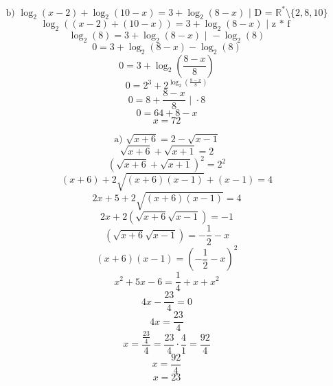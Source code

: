 \documentclass{article}
\begin{document}
\[
\text{b) } \log_2(x-2) + \log_2(10-x) = 3 + \log_2(8-x) \text{ | D = } \mathbb{R}^* \setminus \{2,8,10\}
\]
\[
\log_2((x-2) + (10-x)) = 3 + \log_2(8-x) \text{ | z * f }
\]
\[
\log_2(8) = 3 + \log_2(8-x) \text{ | } -\log_2(8)
\]
\[
0 = 3 + \log_2(8-x) - \log_2(8)
\]
\[
0 = 3 + \log_2\left(\frac{8-x}{8}\right)
\]
\[
0 = 2^3 + 2^{\log_2\left(\frac{8-x}{8}\right)}
\]
\[
0 = 8 + \frac{8-x}{8} \text{ | } \cdot 8
\]
\[
0 = 64 + 8 - x
\]
\[
x = 72
\]

\[
\text{a) } \sqrt{x+6} = 2 - \sqrt{x-1}
\]
\[
\sqrt{x+6} + \sqrt{x+1} = 2
\]
\[
(\sqrt{x+6} + \sqrt{x+1})^2 = 2^2
\]
\[
(x+6) + 2\sqrt{(x+6)(x-1)} + (x-1) = 4
\]
\[
2x + 5 + 2\sqrt{(x+6)(x-1)} = 4
\]
\[
2x + 2(\sqrt{x+6}\sqrt{x-1}) = -1
\]
\[
(\sqrt{x+6}\sqrt{x-1}) = -\frac{1}{2} - x
\]
\[
(x+6)(x-1) = \left(-\frac{1}{2} - x\right)^2
\]
\[
x^2 + 5x - 6 = \frac{1}{4} + x + x^2
\]
\[
4x - \frac{23}{4} = 0
\]
\[
4x = \frac{23}{4}
\]
\[
x = \frac{\frac{23}{4}}{4} = \frac{23}{4} \cdot \frac{4}{1} = \frac{92}{4}
\]
\[
x = \frac{92}{4}
\]
\[
x = 23
\]
\end{document}
